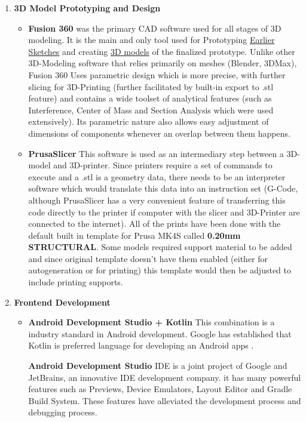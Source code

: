 \begin{enumerate}
\begin{itemize}
	\end{itemize}
	\item\textbf{3D Model Prototyping and Design}
	\begin{itemize}
		\item\textbf{Fusion 360} was the primary \ac{CAD} software used for all stages of 3D modeling. It is the main and only tool used for Prototyping  \hyperref[sec:Bodydesign]{Earlier Sketches} and creating \hyperref[sec:3DPrint]{3D models} of the finalized prototype. Unlike other 3D-Modeling software that relies primarily on meshes (Blender, 3DMax), Fusion 360 Uses parametric design which is more precise, with further slicing for 3D-Printing (further facilitated by built-in export to .stl feature) and contains a wide toolset of analytical features (such as Interference, Center of Mass and Section Analysis which were used extensively). Its parametric nature also allows easy adjustment of dimensions of components whenever an overlap between them happens.
		
		\item\textbf{PrusaSlicer} This software is used as an intermediary step between a 3D-model and 3D-printer. Since printers require a set of commands to execute and a .stl is a geometry data, there needs to be an interpreter software which would translate this data into an instruction set (G-Code, although PrusaSlicer has a very convenient feature of transferring this code directly to the printer if computer with the slicer and 3D-Printer are connected to the internet). All of the prints have been done with the default built in template for Prusa MK4S called \textbf{0.20mm STRUCTURAL}. Some models required support material to be added and since original template doesn't have them enabled (either for autogeneration or for printing) this template would then be adjusted to include printing supports.
	\end{itemize}
	\item\textbf{Frontend Development}
	\begin{itemize}
		
		\item \textbf{Android Development Studio + Kotlin} This combination is a industry standard in Android development. Google has established that Kotlin is preferred language for developing an Android apps \cite{googleIO2019Kotlin}. 
		
		\textbf{Android Development Studio} \ac{IDE} is a joint project of Google and JetBrains, an innovative \ac{IDE} development company. it has many powerful features such as Previews, Device Emulators, Layout Editor and Gradle Build System. These features have alleviated the development process and debugging process.
		

\end{itemize}
\end{enumerate}
